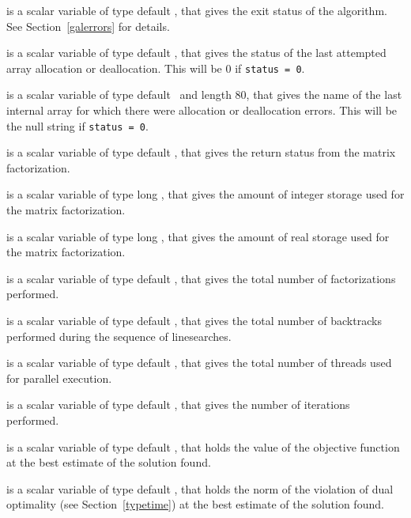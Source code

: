 \begin{description}

 is a scalar variable of type default \integer, that gives the
exit status of the algorithm.
See Section~\ref{galerrors}
for details.

 is a scalar variable of type default \integer, that gives
the status of the last attempted array allocation or deallocation.
This will be 0 if {\tt status = 0}.

 is a scalar variable of type default \character\
and length 80, that  gives the name of the last internal array
for which there were allocation or deallocation errors.
This will be the null string if {\tt status = 0}.

 is a scalar variable of type default \integer, that
gives the return status from the matrix factorization.

 is a scalar variable of type long
\integer, that gives the amount of integer storage used for the matrix
factorization.

 is a scalar variable of type long \integer,
that gives the amount of real storage used for the matrix factorization.

 is a scalar variable of type default \integer, that gives the
total number of factorizations performed.

 is a scalar variable of type default \integer, that gives the
total number of backtracks performed during the sequence of linesearches.

 is a scalar variable of type default \integer, that gives the
total number of threads used for parallel execution.

 is a scalar variable of type default \integer, that
gives the number of iterations performed.

 is a scalar variable of type default \realdp, that holds the
value of the objective function at the best estimate of the solution found.


 is a scalar variable of type default \realdp,
that holds the norm of the violation of dual optimality
(see Section~\ref{typetime}) at the best estimate of the solution found.


\end{description}
